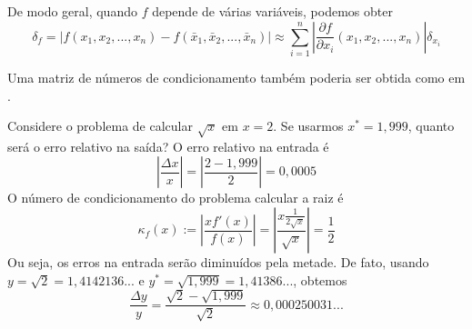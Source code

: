 
De modo geral, quando $f$ depende de várias variáveis, podemos obter
\begin{equation}
\delta_f=|f(x_1,x_2,...,x_n)-f(\bar{x}_1, \bar{x}_2,...,\bar{x}_n)|\approx \sum_{i=1}^n\left|\frac{\partial f}{\partial x_i}(x_1, x_2,...,x_n)\right|\delta_{x_i}
\end{equation}

Uma matriz de números de condicionamento também poderia ser obtida como em  \cite{gautschi1997numerical}.

\begin{ex}
Considere o problema de calcular $\sqrt{x}$ em $x=2$. Se usarmos $x^*=1,999$, quanto será o erro relativo na saída? O erro relativo na entrada é
\begin{equation}
   \left|\frac{\Delta x}{x}\right| = \left|\frac{2-1,999}{2}\right| = 0,0005
\end{equation}
O número de condicionamento do problema calcular a raiz é
\begin{equation}
   \kappa_f(x) := \left| \frac{ x f'(x)}{f(x)} \right| =\left| \frac{ x \frac{1}{2\sqrt{x}}}{\sqrt{x}} \right|=\frac{1}{2}
\end{equation}
Ou seja, os erros na entrada serão diminuídos pela metade. De fato, usando $y=\sqrt{2}=1,4142136...$ e $y^*=\sqrt{1,999}=1,41386...$, obtemos
\begin{equation}
   \frac{\Delta y}{y} = \frac{\sqrt{2}-\sqrt{1,999}}{\sqrt{2}} \approx  0,000250031...
\end{equation}
\end{ex}


